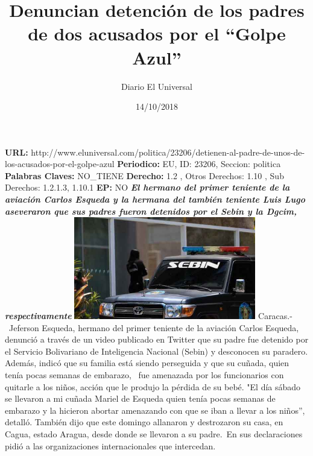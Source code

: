 \documentclass{article}%
\title{\textbf{Denuncian detención de los padres de dos acusados por el “Golpe Azul”}}%
\author{Diario El Universal}%
\date{14/10/2018}%
\begin{document}
%
\normalsize%
\maketitle%
\textbf{URL: }%
http://www.eluniversal.com/politica/23206/detienen{-}al{-}padre{-}de{-}unos{-}de{-}los{-}acusados{-}por{-}el{-}golpe{-}azul\newline%
%
\textbf{Periodico: }%
EU, %
ID: %
23206, %
Seccion: %
politica\newline%
%
\textbf{Palabras Claves: }%
NO\_TIENE\newline%
%
\textbf{Derecho: }%
1.2%
, Otros Derechos: %
1.10%
, Sub Derechos: %
1.2.1.3, 1.10.1%
\newline%
%
\textbf{EP: }%
NO\newline%
\newline%
%
\textbf{\textit{El hermano del primer teniente de la aviación Carlos Esqueda y la hermana del también teniente Luis Lugo aseveraron que sus padres fueron detenidos por el Sebin y la Dgcim, respectivamente}}%
\newline%
\newline%
%
\includegraphics[width=300px]{229.jpg}%
\newline%
%
Caracas.{-}~Jeferson Esqueda, hermano del primer teniente de la aviación Carlos Esqueda, denunció a través de un video publicado en Twitter que su padre fue detenido por el Servicio Bolivariano de Inteligencia Nacional (Sebin) y desconocen su paradero.%
\newline%
%
Además, indicó que su familia está siendo perseguida y que su cuñada, quien tenía pocas semanas de embarazo,~ fue amenazada por los funcionarios con quitarle a los niños, acción que le produjo la pérdida de su bebé.%
\newline%
%
"El día sábado se llevaron a mi cuñada Mariel de Esqueda quien tenía pocas semanas de embarazo y la hicieron abortar amenazando con que se iban a llevar a los niños”, detalló.%
\newline%
%
También dijo que este domingo allanaron y destrozaron su casa, en Cagua, estado Aragua, desde donde se llevaron a su padre.~En sus declaraciones pidió a las organizaciones internacionales que intercedan.%
\end{document}
